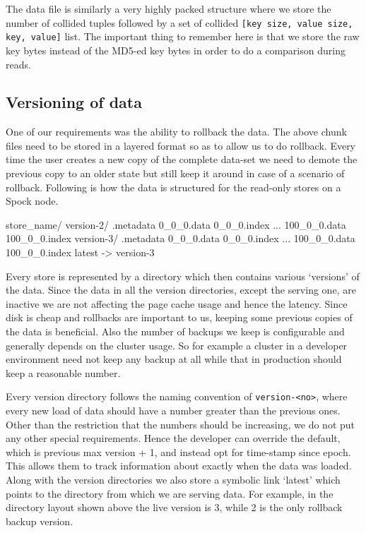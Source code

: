 \documentclass[twocolumn]{article}
\newcommand{\projectname}{Spock}
\begin{document}
The data file is similarly a very highly packed structure where we store the number of collided tuples followed by a set of collided \verb=[key size, value size, key, value]= list. The important thing to remember here is that we store the raw key bytes instead of the MD5-ed key bytes in order to do a comparison during reads. 



\subsection{Versioning of data}
\label{sec:read_only:versioning}

One of our requirements was the ability to rollback the data. The above chunk files need to be stored in a layered format so as to allow us to do rollback. Every time the user creates a new copy of the complete data-set we need to demote the previous copy to an older state but still keep it around in case of a scenario of rollback. Following is how the data is structured for the read-only stores on a \projectname{} node. 

\scriptsize
\begin{verbatimtab}
store_name/
  version-2/
    .metadata
    0_0_0.data
    0_0_0.index
    ...
    100_0_0.data
    100_0_0.index
  version-3/
    .metadata
    0_0_0.data
    0_0_0.index
    ...
    100_0_0.data
    100_0_0.index
  latest -> version-3
\end{verbatimtab}
\normalsize

Every store is represented by a directory which then contains various `versions' of the data. Since the data in all the version directories, except the serving one, are inactive we are not affecting the page cache usage and hence the latency. Since disk is cheap and rollbacks are important to us, keeping some previous copies of the data is beneficial. Also the number of backups we keep is configurable and generally depends on the cluster usage. So for example a cluster in a developer environment need not keep any backup at all while that in production should keep a reasonable number.

Every version directory follows the naming convention of \verb=version-<no>=, where every new load of data should have a number greater than the previous ones. Other than the restriction that the numbers should be increasing, we do not put any other special requirements. Hence the developer can override the default, which is previous max version + 1, and instead opt for time-stamp since epoch. This allows them to track information about exactly when the data was loaded. Along with the version directories we also store a symbolic link `latest' which points to the directory from which we are serving data. For example, in the directory layout shown above the live version is 3, while 2 is the only rollback backup version. 
\end{document}
